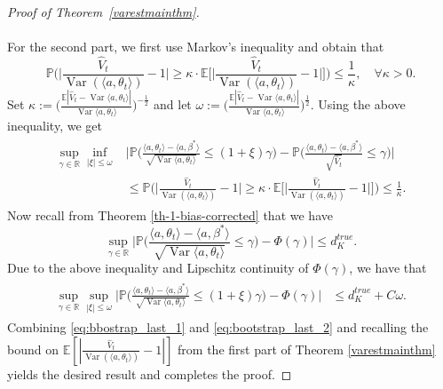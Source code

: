 \documentclass[11pt, reqno,english]{amsart}
\DeclareMathOperator{\Var}{Var} \DeclareMathOperator{\N}{N}
\begin{document}
\begin{proof}[Proof of Theorem~\ref{varestmainthm}]
\\\\
For the second part, we first use Markov's inequality and obtain that
$$\mathbb{P}\Big(\Big|\frac{\hat{V}_t}{\Var(\langle a, \theta_{t} \rangle)}-1\Big|\geq \kappa \cdot \mathbb{E}\Big[\Big|\frac{\hat{V}_t}{\Var(\langle a, \theta_{t} \rangle)}-1\Big|\Big]\Big)\leq \frac{1}{\kappa}, \quad \forall \kappa>0.$$
Set $\kappa := \bigg(\frac{\mathbb{E}|\hat{V}_t - \Var \langle a, \theta_t \rangle|}{\Var \langle a, \theta_t \rangle}\bigg)^{-\frac{1}{2}}$ and let $\omega:=  \bigg(\frac{\mathbb{E}|\hat{V}_t - \Var \langle a, \theta_t \rangle|}{\Var \langle a, \theta_t \rangle}\bigg)^{\frac{1}{2}}$. Using the above inequality, we get 
\begin{align}\label{eq:bbostrap_last_1}
\begin{aligned}
    \sup_{\gamma \in \mathbb{R}} \inf_{|\xi|\leq \omega } &\bigg|\mathbb{P}\bigg(\frac{\langle a, \theta_t \rangle - \langle a, \beta^* \rangle}{\sqrt{\Var\langle a, \theta_t \rangle}}\leq (1+\xi)\gamma\bigg) - \mathbb{P}\bigg(\frac{\langle a, \theta_t \rangle - \langle a, \beta^* \rangle}{\sqrt{\hat{V}_t}}\leq \gamma\bigg) \bigg| \\
    &\leq  \mathbb{P}\Big(\Big|\frac{\hat{V}_t}{\Var(\langle a, \theta_{t} \rangle)}-1\Big|\geq \kappa \cdot  \mathbb{E}\Big[\Big|\frac{\hat{V}_t}{\Var(\langle a, \theta_{t} \rangle)}-1\Big|\Big]\Big)\leq \frac{1}{\kappa}.
    \end{aligned}
\end{align}
Now recall from Theorem \ref{th-1-bias-corrected} that we have
$$
\sup_{\gamma \in \mathbb{R}} \bigg|\mathbb{P}\bigg(\frac{\langle a, \theta_t \rangle - \langle a, \beta^* \rangle}{\sqrt{\Var\langle a, \theta_t \rangle}}\leq \gamma\bigg) - \Phi(\gamma)\bigg| \leq d^{true}_K.$$
Due to the above inequality and Lipschitz continuity of $\Phi(\gamma)$, we have that
\begin{align}\label{eq:bootstrap_last_2}
\begin{aligned}
\sup_{ \gamma \in \mathbb{R}}\sup_{|\xi|\leq \omega} \bigg|\mathbb{P}\bigg(\frac{\langle a, \theta_t \rangle - \langle a, \beta^* \rangle}{\sqrt{\Var\langle a, \theta_t \rangle}}\leq (1+\xi)\gamma\bigg) - \Phi(\gamma)\bigg| &\leq d^{true}_K +C\omega.
\end{aligned}
\end{align}
Combining \eqref{eq:bbostrap_last_1} and \eqref{eq:bootstrap_last_2} and recalling the bound on $\mathbb{E}[|\tfrac{\hat{V}_t}{\Var(\langle a, \theta_{t} \rangle)}-1|]$ from the first part of Theorem \ref{varestmainthm} yields the desired result and completes the proof. 

\end{proof}
\end{document}
